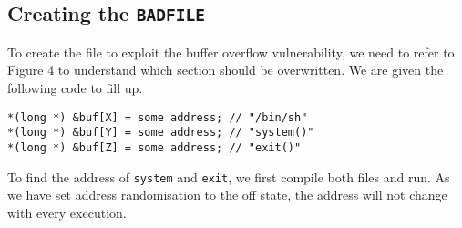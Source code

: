 \documentclass[a4paper,12pt]{article}
\begin{document}
\subsection{Creating the \texttt{BADFILE}}
To create the file to exploit the buffer overflow vulnerability, we need to refer to Figure 4 to understand which section should be overwritten. We are given the following code to fill up.
\begin{verbatim}
*(long *) &buf[X] = some address; // "/bin/sh"
*(long *) &buf[Y] = some address; // "system()"
*(long *) &buf[Z] = some address; // "exit()"
\end{verbatim}
To find the address of \texttt{system} and \texttt{exit}, we first compile both files and run. As we have set address randomisation to the off state, the address will not change with every execution.
\end{document}
